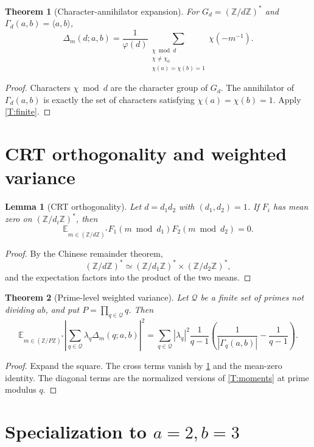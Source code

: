 \documentclass[11pt]{article}
\newtheorem{theorem}{Theorem}
\newtheorem{lemma}{Lemma}
\newcommand{\Z}{\mathbb Z}
\newcommand{\E}{\mathbb E}
\newcommand{\1}{\mathbf 1}
\begin{document}
\begin{theorem}[Character-annihilator expansion]\label{T:char}
For \(G_d=(\Z/d\Z)^*\) and \(\Gamma_d(a,b)=\langle a,b\rangle\),
\[
\Delta_m(d;a,b)=
\frac1{\varphi(d)}
\sum_{\substack{\chi\bmod d\\ \chi\ne\chi_0\\ \chi(a)=\chi(b)=1}}
\chi(-m^{-1}).
\]
\end{theorem}

\begin{proof}
Characters \(\chi\bmod d\) are the character group of \(G_d\).  The annihilator of \(\Gamma_d(a,b)\) is exactly the set of characters satisfying \(\chi(a)=\chi(b)=1\).  Apply \cref{T:finite}.
\end{proof}

\section{CRT orthogonality and weighted variance}

\begin{lemma}[CRT orthogonality]\label{L:crt}
Let \(d=d_1d_2\) with \((d_1,d_2)=1\).  If \(F_i\) has mean zero on \((\Z/d_i\Z)^*\), then
\[
\E_{m\in(\Z/d\Z)^*}F_1(m\bmod d_1)F_2(m\bmod d_2)=0.
\]
\end{lemma}

\begin{proof}
By the Chinese remainder theorem,
\[
(\Z/d\Z)^*\simeq(\Z/d_1\Z)^*\times(\Z/d_2\Z)^*,
\]
and the expectation factors into the product of the two means.
\end{proof}

\begin{theorem}[Prime-level weighted variance]\label{T:weighted}
Let \(\mathcal Q\) be a finite set of primes not dividing \(ab\), and put \(P=\prod_{q\in\mathcal Q}q\).  Then
\[
\E_{m\in(\Z/P\Z)^*}
\left|
\sum_{q\in\mathcal Q}\lambda_q\Delta_m(q;a,b)
\right|^2
=
\sum_{q\in\mathcal Q}
|\lambda_q|^2
\frac1{q-1}
\left(
\frac1{|\Gamma_q(a,b)|}-\frac1{q-1}
\right).
\]
\end{theorem}

\begin{proof}
Expand the square.  The cross terms vanish by \cref{L:crt} and the mean-zero identity.  The diagonal terms are the normalized versions of \cref{T:moments} at prime modulus \(q\).
\end{proof}

\section{Specialization to \texorpdfstring{\(a=2,b=3\)}{a=2, b=3}}
\end{document}
